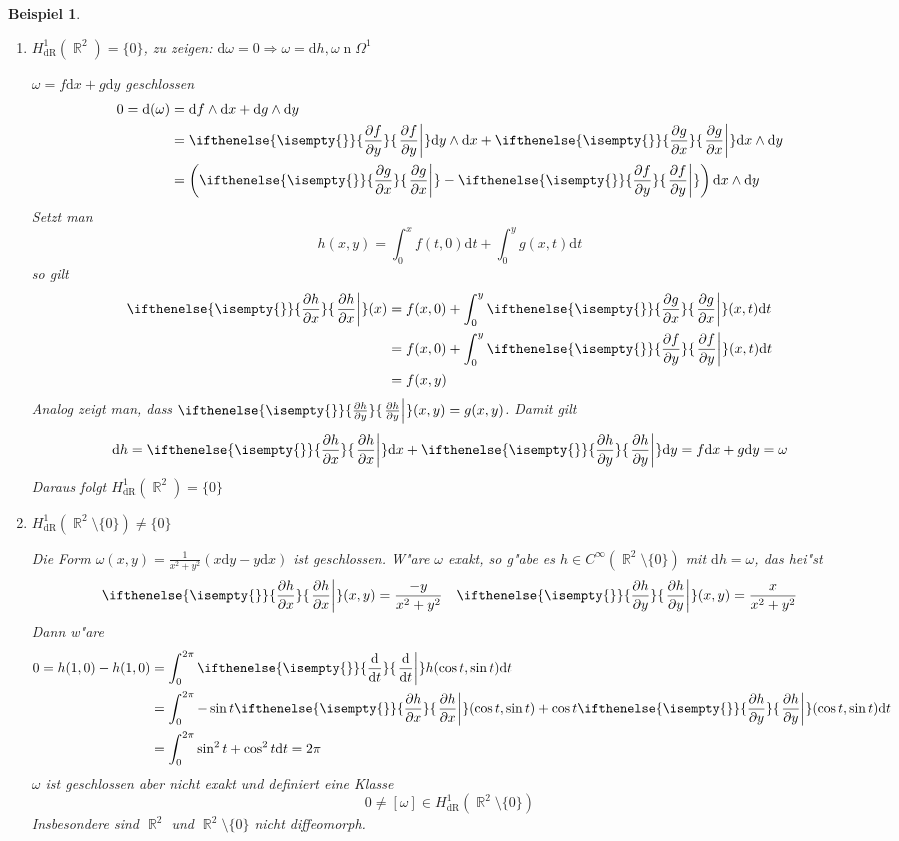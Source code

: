 \documentclass[paper=A4, twoside, chapterprefix=true, bibliography=totoc, headsepline]{scrbook}
\DeclareMathOperator{\R}{\mathbb{R}}
\DeclareMathOperator{\dR}{dR}       %
\DeclareMathOperator{\n}{n}         %
\newcommand{\dop}{\mathrm{d}}
\newcommand{\difffrac}[3][]{\ifthenelse{\isempty{#1}}{\frac{\dop #2}{\dop #3}}{\left. \frac{\dop #2}{\dop #3} \right|_{#1}}}
\newcommand{\pdifffrac}[3][]{\ifthenelse{\isempty{#1}}{\frac{\partial #2}{\partial #3}}{\left. \frac{\partial #2}{\partial #3} \right|_{#1}}}
\theoremstyle{plain}
\theoremstyle{nonumberplain}
\newtheorem{bsp}{Beispiel}
\theoremstyle{empty}
\theoremstyle{break}
\begin{document}
\begin{bsp}
  \begin{enumerate}[label=(\arabic*),leftmargin=*]
  \item $H_{\dR}^1(\R^2) = \{0\}$, \emph{zu zeigen:} $\dop \omega = 0 \Rightarrow \omega = \dop h, \omega \n \Omega^1$
    
    $\omega = f \dop x + g \dop y$ geschlossen
    \begin{align*}
      0 = \dop (\omega) &= \dop f \wedge \dop x + \dop g \wedge \dop y\\
      &= \pdifffrac{f}{y} \dop y \wedge \dop x + \pdifffrac{g}{x} \dop x \wedge \dop y\\
      &= \left( \pdifffrac{g}{x} - \pdifffrac{f}{y} \right) \dop x \wedge \dop y
    \end{align*}
    Setzt man
    \[ h(x,y) = \int_0^{x} f(t,0) \dop t + \int_0^{y} g(x,t) \dop t \]
    so gilt
    \begin{align*}
      \pdifffrac{h}{x}(x) &= f(x,0) + \int_0^{y} \pdifffrac{g}{x}(x,t) \dop t\\
      &= f(x,0) + \int_0^{y} \pdifffrac{f}{y} (x,t) \dop t\\
      &= f(x,y)
    \end{align*}
    Analog zeigt man, dass $\pdifffrac{h}{y}(x,y) = g(x,y)$. Damit gilt
    \[ \dop h = \pdifffrac{h}{x} \dop x + \pdifffrac{h}{y} \dop y = f \dop x + g \dop y = \omega \]
    Daraus folgt $H_{\dR}^1(\R^2) = \{0\}$
  \item $H_{\dR}^1(\R^2 \setminus \{0\}) \ne \{0\}$
    
    Die Form $\omega(x,y) = \frac{1}{x^2+y^2} (x \dop y - y \dop x)$ ist geschlossen. W"are $\omega$ exakt, so g"abe es $h \in C^{\infty}(\R^2 \setminus \{0\})$ mit $\dop h = \omega$, das hei"st
    \begin{align*}
	    	\pdifffrac{h}{x}(x,y) = \frac{-y}{x^2+y^2} && \pdifffrac{h}{y}(x,y) = \frac{x}{x^2+y^2}
	\end{align*}
    Dann w"are
    \begin{align*}
      0 = h(1,0) - h(1,0) &= \int_{0}^{2\pi} \difffrac{}{t} h(\cos t, \sin t) \dop t\\
      &= \int_{0}^{2\pi} - \sin t \pdifffrac{h}{x} (\cos t, \sin t) + \cos t \pdifffrac{h}{y} (\cos t, \sin t) \dop t\\
      &= \int_{0}^{2\pi} \sin^2 t + \cos^2 t \dop t = 2 \pi
    \end{align*}
    $\omega$ ist geschlossen aber \emph{nicht} exakt und definiert eine Klasse
    \[ 0 \ne [\omega] \in H_{\dR}^1(\R^2 \setminus \{0\}) \]
    Insbesondere sind $\R^2$ und $\R^2 \setminus \{0\}$ \emph{nicht} diffeomorph.
  \end{enumerate}
\end{bsp}
\end{document}

